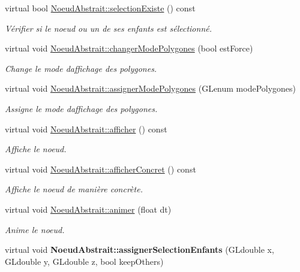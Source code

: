 \begin{DoxyCompactItemize}
virtual bool \hyperlink{group__inf2990_gae7c702b865babd20ddd30dd776adc82b}{Noeud\+Abstrait\+::selection\+Existe} () const 
\begin{DoxyCompactList}\small\item\em Vérifier si le noeud ou un de ses enfants est sélectionné. \end{DoxyCompactList}\item 
virtual void \hyperlink{group__inf2990_ga13a97383c2081b405fc2e0d97cff80df}{Noeud\+Abstrait\+::changer\+Mode\+Polygones} (bool est\+Force)
\begin{DoxyCompactList}\small\item\em Change le mode d\textquotesingle{}affichage des polygones. \end{DoxyCompactList}\item 
virtual void \hyperlink{group__inf2990_ga726d9d0a524939f405aeeac3fbd06666}{Noeud\+Abstrait\+::assigner\+Mode\+Polygones} (G\+Lenum mode\+Polygones)
\begin{DoxyCompactList}\small\item\em Assigne le mode d\textquotesingle{}affichage des polygones. \end{DoxyCompactList}\item 
virtual void \hyperlink{group__inf2990_gae789271ea41032d717b8e4300be05de0}{Noeud\+Abstrait\+::afficher} () const 
\begin{DoxyCompactList}\small\item\em Affiche le noeud. \end{DoxyCompactList}\item 
virtual void \hyperlink{group__inf2990_ga330df455c8b08440d3c8e64d0a480391}{Noeud\+Abstrait\+::afficher\+Concret} () const 
\begin{DoxyCompactList}\small\item\em Affiche le noeud de manière concrète. \end{DoxyCompactList}\item 
virtual void \hyperlink{group__inf2990_gadc6ebe69894dbb682fdd0ecb1b6c11e9}{Noeud\+Abstrait\+::animer} (float dt)
\begin{DoxyCompactList}\small\item\em Anime le noeud. \end{DoxyCompactList}\item 
\hypertarget{group__inf2990_ga78bba41d63a1a2a621e82c8247180b42}{}virtual void {\bfseries Noeud\+Abstrait\+::assigner\+Selection\+Enfants} (G\+Ldouble x, G\+Ldouble y, G\+Ldouble z, bool keep\+Others)\label{group__inf2990_ga78bba41d63a1a2a621e82c8247180b42}


\end{DoxyCompactItemize}
